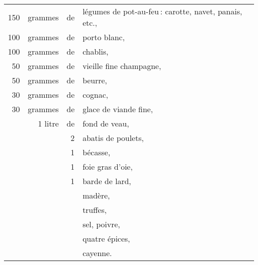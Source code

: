 \footnotesize
\begin{longtable}{rrrp{16em}}
    150 & grammes & de & légumes de pot-au-feu : carotte, navet, panais, etc.,                            \\
    100 & grammes & de & porto blanc,                                                                     \\
    100 & grammes & de & chablis,                                                                         \\
     50 & grammes & de & vieille fine champagne,                                                          \\
     50 & grammes & de & beurre,                                                                          \\
     30 & grammes & de & cognac,                                                                          \\
     30 & grammes & de & glace de viande fine,                                                            \\
        & 1 litre & de & fond de veau,                                                                    \\
        &         &  2 & abatis de poulets,                                                               \\
        &         &  1 & bécasse,                                                                         \\
        &         &  1 & foie gras d'oie,                                                                 \\
        &         &  1 & barde de lard,                                                                   \\
        &         &    & madère,                                                                          \\
        &         &    & truffes,                                                                         \\
        &         &    & sel, poivre,                                                                     \\
        &         &    & quatre épices,                                                                   \\
        &         &    & cayenne.                                                                         \\
\end{longtable}
\normalsize

